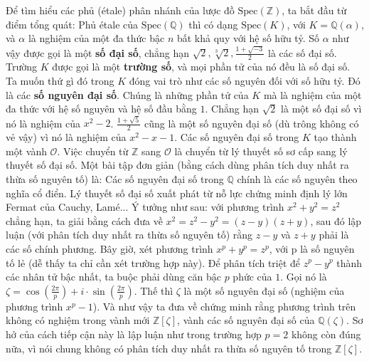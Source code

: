 \begin{multicols}{2}
	\vskip 0.1cm
	Để tìm hiểu các phủ (étale) phân nhánh của lược đồ $\text{Spec}(\mathbb{Z})$, ta bắt đầu từ điểm tổng quát: Phủ étale của $\text{Spec}(\mathbb{Q})$ thì có dạng $\text{Spec}(K)$, với $K = \mathbb{Q}(\alpha)$, và $\alpha$ là nghiệm của một đa thức bậc $n$ bất khả quy với hệ số hữu tỷ. Số $\alpha$ như vậy được gọi là một {\bf\color{duongvaotoanhoc} số đại số}, chẳng hạn $\sqrt{2}, \sqrt[3]{2}, \frac{1 + \sqrt{-3}}{2}$ là các số đại số. Trường $K$ được gọi là một {\bf\color{duongvaotoanhoc} trường số}, và mọi phần tử của nó đều là số đại số. Ta muốn thứ gì đó trong $K$ đóng vai trò như các số nguyên đối với số hữu tỷ. Đó là các {\bf\color{duongvaotoanhoc} số nguyên đại số}. Chúng là những phần tử của $K$ mà là nghiệm của một đa thức với hệ số nguyên và hệ số đầu bằng $1$. Chẳng hạn $\sqrt{2}$ là một số đại số vì nó là nghiệm của $x^2 - 2$. $\frac{1 + \sqrt{5}}{2}$ cũng là một số nguyên đại số (dù trông không có vẻ vậy) vì nó là nghiệm của $x^2-x-1$. Các số nguyên đại số trong $K$ tạo thành một vành $\mathcal{O}$. Việc chuyển từ $\mathbb{Z}$ sang $\mathcal{O}$ là chuyển từ lý thuyết số sơ cấp sang lý thuyết số đại số. Một bài tập đơn giản (bằng cách dùng phân tích duy nhất ra thừa số nguyên tố) là: Các số nguyên đại số trong $\mathbb{Q}$ chính là các số nguyên theo nghĩa cổ điển.
	\vskip 0.1cm
	Lý thuyết số đại số xuất phát từ nỗ lực chứng minh định lý lớn Fermat của Cauchy, Lamé... Ý tưởng như sau: với phương trình $x^2 + y^2 = z^2$ chẳng hạn, ta giải bằng cách đưa về $x^2=z^2-y^2=(z-y)(z+y)$, sau đó lập luận (với phân tích duy nhất ra thừa số nguyên tố) rằng $z-y$ và $z+y$ phải là các số chính phương. Bây giờ, xét phương trình $x^p+y^p=z^p$, với p là số nguyên tố lẻ (dễ thấy ta chỉ cần xét trường hợp này). Để phân tích triệt để $z^p-y^p$ thành các nhân tử bậc nhất, ta buộc phải dùng căn bậc $p$ phức của $1$. Gọi nó là $\zeta = \cos(\frac{2\pi}{p})+i \cdot \sin(\frac{2\pi}{p})$. Thế thì $\zeta$ là một số nguyên đại số (nghiệm của phương trình $x^p - 1$). Và như vậy ta đưa về chứng minh rằng phương trình trên không có nghiệm trong vành mới $\mathbb{Z}[\zeta]$, vành các số nguyên đại số của $\mathbb{Q}(\zeta)$. Sơ hở của cách tiếp cận này là lập luận như trong trường hợp $p=2$ không còn đúng nữa, vì nói chung không có phân tích duy nhất ra thừa số nguyên tố trong $\mathbb{Z}[\zeta]$.
	\vskip 0.1cm

\end{multicols}
